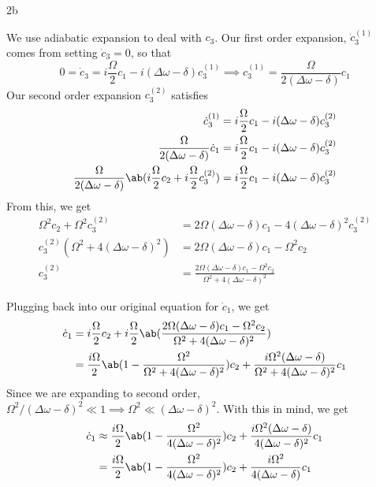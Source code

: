 \documentclass[12pt]{article}
\begin{document}
\begin{exc}{2b}
    
\end{exc}
\begin{ans}
    We use adiabatic expansion to deal with $c_3$. Our first order expansion, $\dot c_3^{(1)}$ comes from setting $\dot c_3 = 0$, so that  
    \[0 = \dot c_3 = i\frac \Omega 2 c_1 - i(\Delta \omega - \delta) c_3^{(1)} \implies c_3^{(1)} = \frac \Omega{2(\Delta \omega - \delta)} c_1\]
    Our second order expansion $c_3^{(2)}$ satisfies 
    \begin{align*}
        \dot c_3^{(1)} &= i\frac \Omega 2 c_1 - i(\Delta \omega - \delta)c_3^{(2)}\\ 
        \frac{\Omega}{2(\Delta \omega - \delta)}\dot c_1 &= i\frac \Omega 2 c_1 - i(\Delta \omega - \delta)c_3^{(2)}\\
        \frac{\Omega}{2(\Delta \omega - \delta)}\ab(i\frac \Omega2c_2  + i\frac \Omega2c_3^{(2)}) &= i\frac \Omega 2 c_1 - i(\Delta \omega - \delta)c_3^{(2)}
    \end{align*}
    From this, we get 
    \begin{align*}
        \Omega^2c_2  + \Omega^2c_3^{(2)} &= 2\Omega(\Delta \omega - \delta) c_1 - 4(\Delta \omega - \delta)^2c_3^{(2)} \\ 
        c_3^{(2)}( \Omega^2 + 4(\Delta \omega - \delta)^2) &= 2\Omega(\Delta \omega - \delta) c_1 - \Omega^2 c_2 \\ 
        c_3^{(2)} &= \frac{2\Omega(\Delta \omega - \delta) c_1 - \Omega^2 c_2 }{\Omega^2 + 4(\Delta \omega - \delta)^2}
    \end{align*}

    Plugging back into our original equation for $\dot c_1$, we get 
    \begin{align*}
        \dot c_1 
        &=  i\frac{\Omega}2 c_2 + i\frac \Omega 2 \ab(\frac{2\Omega(\Delta \omega - \delta) c_1 - \Omega^2 c_2 }{\Omega^2 + 4(\Delta \omega - \delta)^2}) \\ 
        &= \frac{i\Omega}2\ab(1  - \frac{\Omega^2}{\Omega^2 + 4(\Delta \omega - \delta)^2})c_2 + \frac{i\Omega^2(\Delta \omega - \delta)}{\Omega^2 + 4(\Delta \omega -\delta)^2}c_1
    \end{align*}
    Since we are expanding to second order, $\Omega^2/(\Delta \omega - \delta)^2 \ll 1 \implies \Omega^2 \ll (\Delta \omega - \delta)^2$. With this in mind, we get 
    \begin{align*}
        \dot c_1 
        &\approx \frac{i\Omega}2\ab(1  - \frac{\Omega^2}{4(\Delta \omega - \delta)^2})c_2 + \frac{i\Omega^2(\Delta \omega - \delta)}{4(\Delta \omega -\delta)^2}c_1\\
        &= \frac{i\Omega}2\ab(1  - \frac{\Omega^2}{4(\Delta \omega - \delta)^2})c_2 + \frac{i\Omega^2}{4(\Delta \omega -\delta)}c_1
    \end{align*}
\end{ans}
\end{document}
